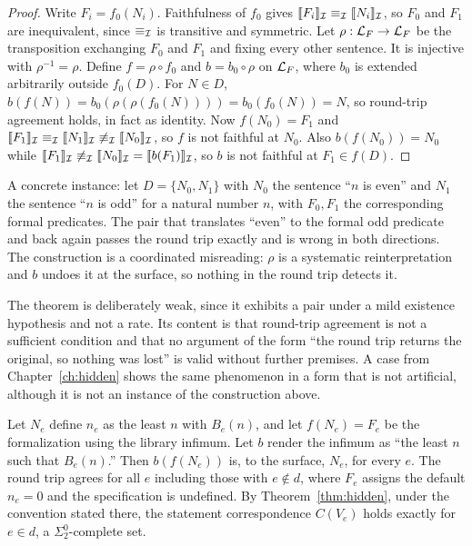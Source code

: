 \begin{proof}
Write $F_i=f_0(N_i)$. Faithfulness of $f_0$ gives $\llbracket F_i\rrbracket_{\mathcal{I}}\equiv_{\mathcal{I}}\llbracket N_i\rrbracket_{\mathcal{I}}$, so $F_0$ and $F_1$ are inequivalent, since $\equiv_{\mathcal{I}}$ is transitive and symmetric. Let $\rho:\mathcal{L}_F\to\mathcal{L}_F$ be the transposition exchanging $F_0$ and $F_1$ and fixing every other sentence. It is injective with $\rho^{-1}=\rho$. Define $f=\rho\circ f_0$ and $b=b_0\circ\rho$ on $\mathcal{L}_F$, where $b_0$ is extended arbitrarily outside $f_0(D)$. For $N\in D$, $b(f(N))=b_0(\rho(\rho(f_0(N))))=b_0(f_0(N))=N$, so round-trip agreement holds, in fact as identity. Now $f(N_0)=F_1$ and $\llbracket F_1\rrbracket_{\mathcal{I}}\equiv_{\mathcal{I}}\llbracket N_1\rrbracket_{\mathcal{I}}\not\equiv_{\mathcal{I}}\llbracket N_0\rrbracket_{\mathcal{I}}$, so $f$ is not faithful at $N_0$. Also $b(f(N_0))=N_0$ while $\llbracket F_1\rrbracket_{\mathcal{I}}\not\equiv_{\mathcal{I}}\llbracket N_0\rrbracket_{\mathcal{I}}=\llbracket b(F_1)\rrbracket_{\mathcal{I}}$, so $b$ is not faithful at $F_1\in f(D)$.
\end{proof}

A concrete instance: let $D=\{N_0,N_1\}$ with $N_0$ the sentence ``$n$ is even'' and $N_1$ the sentence ``$n$ is odd'' for a natural number $n$, with $F_0,F_1$ the corresponding formal predicates. The pair that translates ``even'' to the formal odd predicate and back again passes the round trip exactly and is wrong in both directions. The construction is a coordinated misreading: $\rho$ is a systematic reinterpretation and $b$ undoes it at the surface, so nothing in the round trip detects it.

The theorem is deliberately weak, since it exhibits a pair under a mild existence hypothesis and not a rate. Its content is that round-trip agreement is not a sufficient condition and that no argument of the form ``the round trip returns the original, so nothing was lost'' is valid without further premises. A case from Chapter~\ref{ch:hidden} shows the same phenomenon in a form that is not artificial, although it is not an instance of the construction above.

\begin{example}
\label{ex:rtdefault}
Let $N_e$ define $n_e$ as the least $n$ with $B_e(n)$, and let $f(N_e)=F_e$ be the formalization using the library infimum. Let $b$ render the infimum as ``the least $n$ such that $B_e(n)$.'' Then $b(f(N_e))$ is, to the surface, $N_e$, for every $e$. The round trip agrees for all $e$ including those with $e \notin d$, where $F_e$ assigns the default $n_e=0$ and the specification is undefined. By Theorem~\ref{thm:hidden}, under the convention stated there, the statement correspondence $C(V_e)$ holds exactly for $e\in d$, a $\Sigma^0_2$-complete set.
\end{example}

